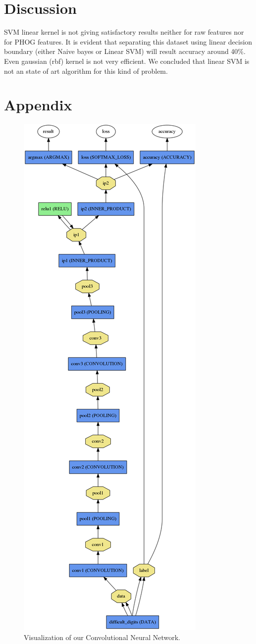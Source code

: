 \documentclass[10pt,twocolumn]{article}
\begin{document}
\section{Discussion}
SVM linear kernel is not giving satisfactory results neither for raw features nor for PHOG features. It is evident that separating this dataset using linear decision boundary (either Naive bayes or Linear SVM) will result accuracy around 40\%. Even gaussian (rbf) kernel is not very efficient. We concluded that linear SVM is not an state of art algorithm for this kind of problem.



\section*{Appendix}
\begin{figure}
\includegraphics[scale=0.30]{./nn.png}
\caption{Visualization of our Convolutional Neural Network.}
\end{figure}
\end{document}
